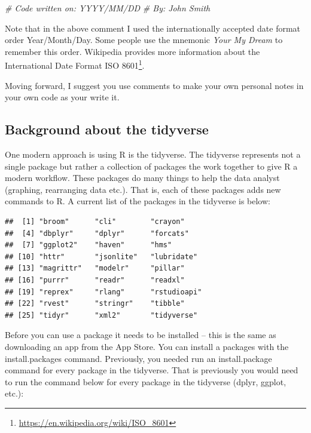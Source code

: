 \documentclass[
]{krantz}
\makeatletter
\newenvironment{Shaded}{\begin{snugshade}}{\end{snugshade}}
\newcommand{\CommentTok}[1]{\textcolor[rgb]{0.37,0.37,0.37}{\textit{#1}}}
\renewcommand{\href}[2]{#2\footnote{\url{#1}}}
\newenvironment{kframe}{%
\medskip{}
\setlength{\fboxsep}{.8em}
 \def\at@end@of@kframe{}%
 \ifinner\ifhmode%
  \def\at@end@of@kframe{\end{minipage}}%
  \begin{minipage}{\columnwidth}%
 \fi\fi%
 \def\FrameCommand##1{\hskip\@totalleftmargin \hskip-\fboxsep
 \colorbox{shadecolor}{##1}\hskip-\fboxsep
     \hskip-\linewidth \hskip-\@totalleftmargin \hskip\columnwidth}%
 \MakeFramed {\advance\hsize-\width
   \@totalleftmargin\z@ \linewidth\hsize
   \@setminipage}}%
 {\par\unskip\endMakeFramed%
 \at@end@of@kframe}
\renewenvironment{Shaded}{\begin{kframe}}{\end{kframe}}
\makeatother
\begin{document}
\begin{Shaded}
\begin{Highlighting}[]
\CommentTok{# Code written on: YYYY/MM/DD }
\CommentTok{# By: John Smith}
\end{Highlighting}
\end{Shaded}

Note that in the above comment I used the internationally accepted date format order Year/Month/Day. Some people use the mnemonic \emph{Your My Dream} to remember this order. Wikipedia provides more information about the \href{https://en.wikipedia.org/wiki/ISO_8601}{International Date Format ISO 8601}.

Moving forward, I suggest you use comments to make your own personal notes in your own code as your write it.

\hypertarget{background-about-the-tidyverse}{%
\subsection{Background about the tidyverse}\label{background-about-the-tidyverse}}

One modern approach is using R is the tidyverse. The tidyverse represents not a single package but rather a collection of packages the work together to give R a modern workflow. These packages do many things to help the data analyst (graphing, rearranging data etc.). That is, each of these packages adds new commands to R. A current list of the packages in the tidyverse is below:

\begin{verbatim}
##  [1] "broom"      "cli"        "crayon"    
##  [4] "dbplyr"     "dplyr"      "forcats"   
##  [7] "ggplot2"    "haven"      "hms"       
## [10] "httr"       "jsonlite"   "lubridate" 
## [13] "magrittr"   "modelr"     "pillar"    
## [16] "purrr"      "readr"      "readxl"    
## [19] "reprex"     "rlang"      "rstudioapi"
## [22] "rvest"      "stringr"    "tibble"    
## [25] "tidyr"      "xml2"       "tidyverse"
\end{verbatim}

Before you can use a package it needs to be installed -- this is the same as downloading an app from the App Store. You can install a packages with the install.packages command. Previously, you needed run an install.package command for every package in the tidyverse. That is previously you would need to run the command below for every package in the tidyverse (dplyr, ggplot, etc.):
\end{document}
